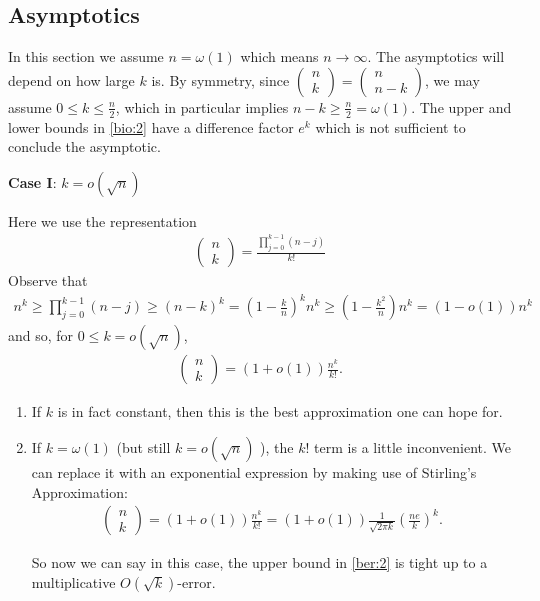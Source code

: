 \documentclass{article}
\begin{document}
\subsection{Asymptotics}
In this section we assume $n=\omega (1)$ which means $n\to \infty$.  The asymptotics will depend on how large $k$ is. By symmetry, since $\left(\begin{array}{c}n \\ k\end{array}\right)=\left(\begin{array}{c}n \\ n-k\end{array}\right)$, we may assume $0 \leq k \leq \frac{n}{2}$, which in particular implies $n-k \geq \frac{n}{2}=\omega(1)$. The upper and lower bounds in \cref{bio:2} have a difference factor $e^k$ which is not sufficient to conclude the asymptotic. 

\textbf{Case I}: $k=o(\sqrt{n})$

Here we use the representation
\begin{align*}
\left(\begin{array}{l}
n \\
k
\end{array}\right)=\frac{\prod_{j=0}^{k-1}(n-j)}{k !}
\end{align*}
Observe that
\begin{align}
n^{k} \geq \prod_{j=0}^{k-1}(n-j) \geq(n-k)^{k}=\left(1-\frac{k}{n}\right)^{k} n^{k} \geq\left(1-\frac{k^{2}}{n}\right) n^{k}=(1-o(1)) n^{k} \label{bio:4}
\end{align}
and so, for $0 \leq k=o(\sqrt{n})$,
\begin{align}
\left(\begin{array}{l}
n \\
k
\end{array}\right)=(1+o(1)) \frac{n^{k}}{k !} . \label{bio:3}
\end{align}
\begin{enumerate}
    \item If $k$ is in fact constant, then this is the best approximation one can hope for.
    \item If $k=\omega(1)$ (but still $k=o(\sqrt{n})$ ), the $k !$ term is a little inconvenient. We can replace it with an exponential expression by making use of Stirling's Approximation:
    \begin{align}
\left(\begin{array}{l}
n \\
k
\end{array}\right)=(1+o(1)) \frac{n^{k}}{k !} = (1+o(1)) \frac{1}{\sqrt{2 \pi k}}\left(\frac{n e}{k}\right)^{k} . \label{bio:3}
\end{align}
\begin{rema}
So now we can say in this case, the upper bound in \cref{ber:2} is tight up to a multiplicative $O(\sqrt{k})$-error.
\end{rema}
\end{enumerate} 
\end{document}
